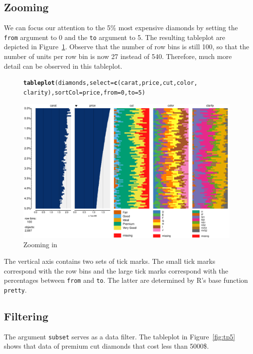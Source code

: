\documentclass[11pt, fleqn, a4paper]{article}\usepackage{graphicx, color}
\makeatletter
\def\maxwidth{ %
  \ifdim\Gin@nat@width>\linewidth
    \linewidth
  \else
    \Gin@nat@width
  \fi
}
\newcommand{\hlfunctioncall}[1]{\textcolor[rgb]{0.501960784313725,0,0.329411764705882}{\textbf{#1}}}%
\newenvironment{kframe}{%
 \def\FrameCommand##1{\hskip\@totalleftmargin \hskip-\fboxsep
 \colorbox{shadecolor}{##1}\hskip-\fboxsep
     \hskip-\linewidth \hskip-\@totalleftmargin \hskip\columnwidth}%
 \MakeFramed {\advance\hsize-\width
   \@totalleftmargin\z@ \linewidth\hsize
   \@setminipage}}%
 {\par\unskip\endMakeFramed}
\newenvironment{knitrout}{}{} %
\makeatother
\begin{document}
\subsection{Zooming}
We can focus our attention to the 5\% most expensive diamonds by setting the {\tt from} argument to 0 and the {\tt to} argument to 5. The resulting tableplot are depicted in Figure~\ref{fig:tp3}. Observe that the number of row bins is still 100, so that the number of units per row bin is now 27 instead of 540. Therefore, much more detail can be observed in this tableplot.


\begin{figure}[!htp]
\begin{knitrout}
\color{fgcolor}\begin{kframe}
\begin{alltt}
\hlfunctioncall{tableplot}(diamonds, select=\hlfunctioncall{c}(carat, price, cut, color, 
          		 clarity), sortCol=price, from=0, to=5)
\end{alltt}
\end{kframe}\includegraphics[width=\maxwidth]{figure/chunk4} 
\end{knitrout}

\vspace{-2em}
\caption{Zooming in}
\label{fig:tp3}
\end{figure}

The vertical axis contains two sets of tick marks. The small tick marks correspond with the row bins and the large tick marks correspond with the percentages between {\tt from} and {\tt to}. The latter are determined by R's base function {\tt pretty}.


\subsection{Filtering}\label{secfilt}
The argument {\tt subset} serves as a data filter. The tableplot in Figure~\ref{fig:tp5} shows that data of premium cut diamonds that cost less than 5000\$.
\end{document}
